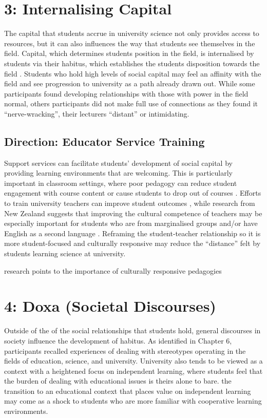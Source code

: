 \section{3: Internalising Capital}
The capital that students accrue in university science not only provides access to resources, but it can also influences the way that students see themselves in the field. Capital, which determines students position in the field, is internalised by students via their habitus, which establishes the students disposition towards the field \cite{Bourdieu1992}. Students who hold high levels of social capital may feel an affinity with the field and see progression to university as a path already drawn out. While some participants found developing relationships with those with power in the field normal, others participants did not make full use of connections as they found it ``nerve-wracking'', their lecturers ``distant'' or intimidating. 


\subsection{Direction: Educator Service Training}
Support services can facilitate students' development of social capital by providing learning environments that are welcoming. This is particularly important in classroom settings, where poor pedagogy can reduce student engagement with course content or cause students to  drop out of courses \cite{russell2011factors}. Efforts to train university teachers can improve student outcomes \cite{gibbs2004impact}, while research from New Zealand suggests that improving the cultural competence of teachers may be especially important for students who are from marginalised groups \cite{ikiua2019pasifika} and/or have English as a second language \cite{campbell2008asian}. Reframing the student-teacher relationship so it is more student-focused \cite{gibbs2004impact} and culturally responsive \cite{ikiua2019pasifika} may reduce the ``distance'' felt by students learning science at university.  

research points to the importance of culturally responsive pedagogies \citep{glynn2010culturally}


\section{4: Doxa (Societal Discourses)}
Outside of the of the social relationships that students hold, general discourses in society influence the development of habitus. As identified in Chapter 6, participants recalled experiences of dealing with stereotypes operating in the fields of education, science, and university. University also tends to be viewed as a context with a heightened focus on independent learning, where students feel that the burden of dealing with educational issues is theirs alone to bare. the transition to an educational context that places value on independent learning may come as a shock to students who are more familiar with cooperative learning environments.


